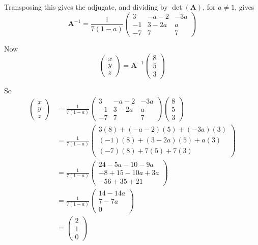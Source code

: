 \documentclass[leqno]{article}
\begin{document}
\begin{enumerate}[
  label=\textbf{\arabic*.},
  leftmargin=*,
  topsep=0pt,
  partopsep=0pt,
  parsep=0pt
]
\begin{djsSolution}
\begin{enumerate}[label=\textbf{(\alph*)}]
\begin{enumerate}[label=(\roman*)]
Transposing this gives the adjugate, and dividing by $\det(\mathbf{A})$, for $a\neq 1$, gives
\[
\mathbf{A}^{-1}=\frac{1}{7(1-a)}
\begin{pmatrix}
3 & -a-2 & -3a \\
-1 & 3-2a & a \\
-7 & 7 & 7
\end{pmatrix}
\]

Now
\[
\begin{pmatrix}x\\y\\z\end{pmatrix}
=\mathbf{A}^{-1}\begin{pmatrix}8\\5\\3\end{pmatrix}
\]

So
\begin{align*}
\begin{pmatrix}x\\y\\z\end{pmatrix}
&=
\frac{1}{7(1-a)}
\begin{pmatrix}
3 & -a-2 & -3a \\
-1 & 3-2a & a \\
-7 & 7 & 7
\end{pmatrix}
\begin{pmatrix}8\\5\\3\end{pmatrix} \\
&=
\frac{1}{7(1-a)}
\begin{pmatrix}
3(8)+(-a-2)(5)+(-3a)(3) \\
(-1)(8)+(3-2a)(5)+a(3) \\
(-7)(8)+7(5)+7(3)
\end{pmatrix} \\
&=
\frac{1}{7(1-a)}
\begin{pmatrix}
24-5a-10-9a \\
-8+15-10a+3a \\
-56+35+21
\end{pmatrix} \\
&=
\frac{1}{7(1-a)}
\begin{pmatrix}
14-14a \\
7-7a \\
0
\end{pmatrix} \\
&=
\begin{pmatrix}
2\\1\\0
\end{pmatrix}
\end{align*}


\end{enumerate}
\end{enumerate}
\end{djsSolution}
\end{enumerate}
\end{document}
